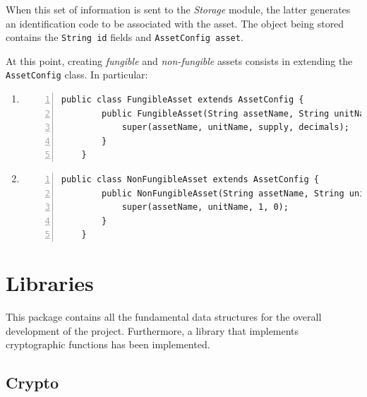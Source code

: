 When this set of information is sent to the \textit{Storage} module, the latter generates an 
identification code to be associated with the asset. The object being stored contains the 
\verb|String id| fields and \verb|AssetConfig asset|.

At this point, creating \textit{fungible} and \textit{non-fungible} assets consists in extending the 
\verb|AssetConfig| class. In particular:
\begin{enumerate}
  \item 
  \begin{Verbatim}[numbers=left,xleftmargin=1cm,firstnumber=1,breaklines=true,breakanywhere=true,tabsize=2]
    public class FungibleAsset extends AssetConfig {
        public FungibleAsset(String assetName, String unitName, int supply, int decimals) {
            super(assetName, unitName, supply, decimals);
        }
    }
  \end{Verbatim}
  \item 
  \begin{Verbatim}[numbers=left,xleftmargin=1cm,firstnumber=1,breaklines=true,breakanywhere=true,tabsize=2]
    public class NonFungibleAsset extends AssetConfig {
        public NonFungibleAsset(String assetName, String unitName) {
            super(assetName, unitName, 1, 0);
        }
    }
  \end{Verbatim}
\end{enumerate}

\section{Libraries}
\label{libraries}

This package contains all the fundamental data structures for the overall development of the project. 
Furthermore, a library that implements cryptographic functions has been implemented.

\subsection{Crypto}

